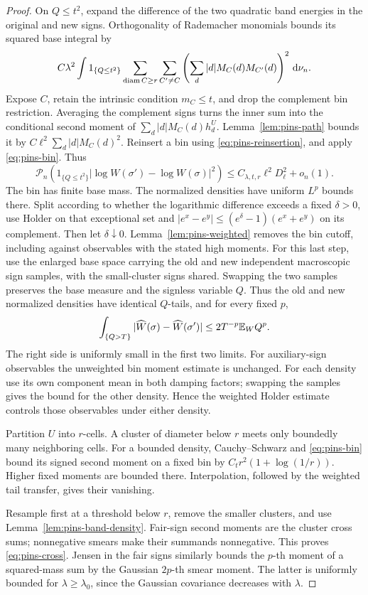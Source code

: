 \begin{proof}
On \(Q\le t^2\), expand the difference of the two quadratic
band energies in the original and new signs. Orthogonality of
Rademacher monomials bounds its squared base integral by
\[
 C\lambda^2\int1_{\{Q\le t^2\}}
 \sum_{\operatorname{diam} C\ge r}\sum_{C'\ne C}
       \left(\sum_d|d|M_C(d)M_{C'}(d)\right)^2\,\mathrm d\nu_n.
\]
Expose \(C\), retain the intrinsic condition \(m_C\le t\),
and drop the complement bin restriction. Averaging the
complement signs turns the inner sum into the conditional
second moment of \(\sum_d|d|M_C(d)h_d^U\).
Lemma~\ref{lem:pins-path} bounds it by
\(C\ell^2\sum_d|d|M_C(d)^2\).
Reinsert a bin using \eqref{eq:pins-reinsertion}, and apply
\eqref{eq:pins-bin}. Thus
\[
 \mathcal P_n\left(1_{\{Q\le t^2\}}
       |\log W(\sigma')-\log W(\sigma)|^2\right)
 \le C_{\lambda,t,r}\ell^2D_\ell^2+o_n(1).
\]
The bin has finite base mass. The normalized densities have
uniform \(L^p\) bounds there. Split according to whether the
logarithmic difference exceeds a fixed \(\delta>0\), use
Holder on that exceptional set and
\(|e^x-e^y|\le(e^\delta-1)(e^x+e^y)\) on its complement.
Then let \(\delta\downarrow0\). Lemma~\ref{lem:pins-weighted}
removes the bin cutoff, including against observables with the
stated high moments.
For this last step, use the enlarged base space carrying the
old and new independent macroscopic sign samples, with the
small-cluster signs shared. Swapping the two samples preserves
the base measure and the signless variable \(Q\). Thus the old
and new normalized densities have identical \(Q\)-tails, and
for every fixed \(p\),
\[
 \int_{\{Q>T\}}|\widehat W(\sigma)-\widehat W(\sigma')|
 \le2T^{-p}\mathbb E_WQ^p.
\]
The right side is uniformly small in the first two limits.
For auxiliary-sign observables the unweighted bin moment
estimate is unchanged. For each density use its own component
mean in both damping factors; swapping the samples gives the
bound for the other density. Hence the weighted Holder
estimate controls those observables under either density.

Partition \(U\) into \(r\)-cells. A cluster of diameter below
\(r\) meets only boundedly many neighboring cells. For a bounded
density, Cauchy--Schwarz and \eqref{eq:pins-bin} bound its signed
second moment on a fixed bin by
\(C_t r^2(1+\log(1/r))\). Higher fixed moments are bounded
there. Interpolation, followed by the weighted tail transfer,
gives their vanishing.

Resample first at a threshold below \(r\), remove the smaller
clusters, and use Lemma~\ref{lem:pins-band-density}. Fair-sign
second moments are the cluster cross sums; nonnegative smears
make their summands nonnegative. This proves
\eqref{eq:pins-cross}. Jensen in the fair signs similarly
bounds the \(p\)-th moment of a squared-mass sum by the
Gaussian \(2p\)-th smear moment. The latter is uniformly
bounded for \(\lambda\ge\lambda_0\), since the Gaussian
covariance decreases with \(\lambda\).
\end{proof}

